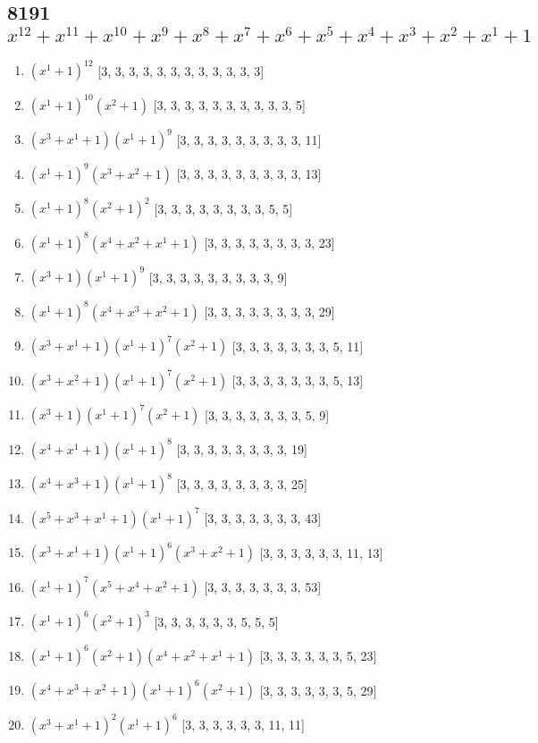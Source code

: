 \documentclass[10pt,twocolumn]{article}
\begin{document}
\subsection*{8191$x^{12} + x^{11} + x^{10} + x^{9} + x^{8} + x^{7} + x^{6} + x^{5} + x^{4} + x^{3} + x^{2} + x^{1} + 1$  } 
\begin{enumerate}
\item $(x^{1} + 1)^{12}$  [3, 3, 3, 3, 3, 3, 3, 3, 3, 3, 3, 3]
\item $(x^{1} + 1)^{10}(x^{2} + 1)$  [3, 3, 3, 3, 3, 3, 3, 3, 3, 3, 5]
\item $(x^{3} + x^{1} + 1)(x^{1} + 1)^{9}$  [3, 3, 3, 3, 3, 3, 3, 3, 3, 11]
\item $(x^{1} + 1)^{9}(x^{3} + x^{2} + 1)$  [3, 3, 3, 3, 3, 3, 3, 3, 3, 13]
\item $(x^{1} + 1)^{8}(x^{2} + 1)^{2}$  [3, 3, 3, 3, 3, 3, 3, 3, 5, 5]
\item $(x^{1} + 1)^{8}(x^{4} + x^{2} + x^{1} + 1)$  [3, 3, 3, 3, 3, 3, 3, 3, 23]
\item $(x^{3} + 1)(x^{1} + 1)^{9}$  [3, 3, 3, 3, 3, 3, 3, 3, 3, 9]
\item $(x^{1} + 1)^{8}(x^{4} + x^{3} + x^{2} + 1)$  [3, 3, 3, 3, 3, 3, 3, 3, 29]
\item $(x^{3} + x^{1} + 1)(x^{1} + 1)^{7}(x^{2} + 1)$  [3, 3, 3, 3, 3, 3, 3, 5, 11]
\item $(x^{3} + x^{2} + 1)(x^{1} + 1)^{7}(x^{2} + 1)$  [3, 3, 3, 3, 3, 3, 3, 5, 13]
\item $(x^{3} + 1)(x^{1} + 1)^{7}(x^{2} + 1)$  [3, 3, 3, 3, 3, 3, 3, 5, 9]
\item $(x^{4} + x^{1} + 1)(x^{1} + 1)^{8}$  [3, 3, 3, 3, 3, 3, 3, 3, 19]
\item $(x^{4} + x^{3} + 1)(x^{1} + 1)^{8}$  [3, 3, 3, 3, 3, 3, 3, 3, 25]
\item $(x^{5} + x^{3} + x^{1} + 1)(x^{1} + 1)^{7}$  [3, 3, 3, 3, 3, 3, 3, 43]
\item $(x^{3} + x^{1} + 1)(x^{1} + 1)^{6}(x^{3} + x^{2} + 1)$  [3, 3, 3, 3, 3, 3, 11, 13]
\item $(x^{1} + 1)^{7}(x^{5} + x^{4} + x^{2} + 1)$  [3, 3, 3, 3, 3, 3, 3, 53]
\item $(x^{1} + 1)^{6}(x^{2} + 1)^{3}$  [3, 3, 3, 3, 3, 3, 5, 5, 5]
\item $(x^{1} + 1)^{6}(x^{2} + 1)(x^{4} + x^{2} + x^{1} + 1)$  [3, 3, 3, 3, 3, 3, 5, 23]
\item $(x^{4} + x^{3} + x^{2} + 1)(x^{1} + 1)^{6}(x^{2} + 1)$  [3, 3, 3, 3, 3, 3, 5, 29]
\item $(x^{3} + x^{1} + 1)^{2}(x^{1} + 1)^{6}$  [3, 3, 3, 3, 3, 3, 11, 11]

\end{enumerate}
\end{document}
